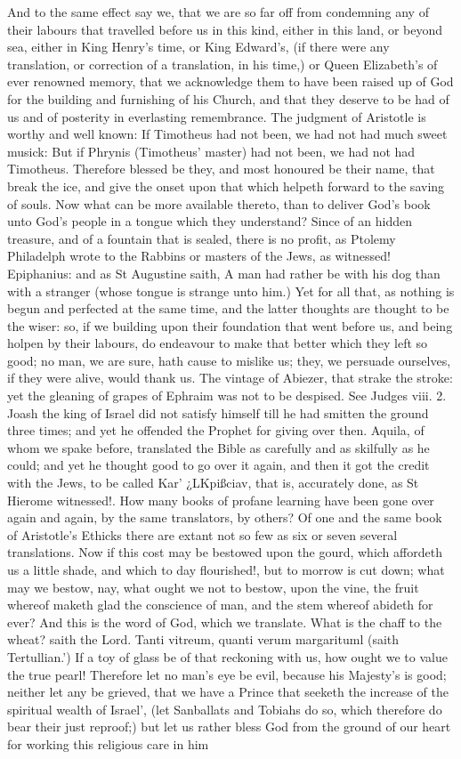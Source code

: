 And to the same effect say we, that we are so far off from condemning any of their labours that travelled before us in this kind, either in this land, or beyond sea, either in King Henry's time, or King Edward's, (if there were any translation, or correction of a translation, in his time,) or Queen Elizabeth's of ever renowned memory, that we acknowledge them to have been raised up of God for the building and furnishing of his Church, and that they deserve to be had of us and of posterity in everlasting remembrance. The judgment of Aristotle is worthy and well known: If Timotheus had not been, we had not had much sweet musick: But if Phrynis (Timotheus' master) had not been, we had not had Timotheus. Therefore blessed be they, and most honoured be their name, that break the ice, and give the onset upon that which helpeth forward to the saving of souls. Now what can be more available thereto, than to deliver God's book unto God's people in a tongue which they understand? Since of an hidden treasure, and of a fountain that is sealed, there is no profit, as Ptolemy Philadelph wrote to the Rabbins or masters of the Jews, as witnessed! Epiphanius: and as St Augustine saith, A man had rather be with his dog than with a stranger (whose tongue is strange unto him.) Yet for all that, as nothing is begun and perfected at the same time, and the latter thoughts are thought to be the wiser: so, if we building upon their foundation that went before us, and being holpen by their labours, do endeavour to make that better which they left so good; no man, we are sure, hath cause to mislike us; they, we persuade ourselves, if they were alive, would thank us. The vintage of Abiezer, that strake the stroke: yet the gleaning of grapes of Ephraim was not to be despised. See Judges viii. 2. Joash the king of Israel did not satisfy himself till he had smitten the ground three times; and yet he offended the Prophet for giving over then. Aquila, of whom we spake before, translated the Bible as carefully and as skilfully as he could; and yet he thought good to go over it again, and then it got the credit with the Jews, to be called Kar' ¿LKpißciav, that is, accurately done, as St Hierome witnessed!. How many books of profane learning have been gone over again and again, by the same translators, by others? Of one and the same book of Aristotle's Ethicks there are extant not so few as six or seven several translations. Now if this cost may be bestowed upon the gourd, which affordeth us a little shade, and which to day flourished!, but to morrow is cut down; what may we bestow, nay, what ought we not to bestow, upon the vine, the fruit whereof maketh glad the conscience of man, and the stem whereof abideth for ever? And this is the word of God, which we translate. What is the chaff to the wheat? saith the Lord. Tanti vitreum, quanti verum margarituml (saith Tertullian.') If a toy of glass be of that reckoning with us, how ought we to value the true pearl! Therefore let no man's eye be evil, because his Majesty's is good; neither let any be grieved, that we have a Prince that seeketh the increase of the spiritual wealth of Israel', (let Sanballats and Tobiahs do so, which therefore do bear their just reproof;) but let us rather bless God from the ground of our heart for working this religious care in him 